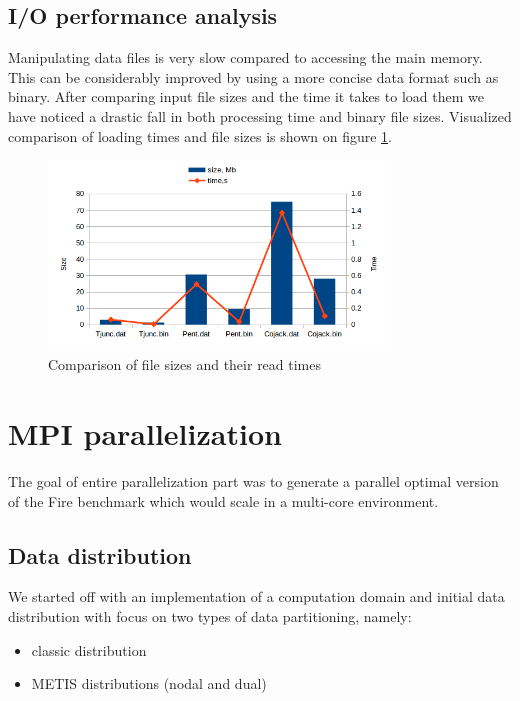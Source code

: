 \documentclass{article}
\begin{document}
\subsection{I/O performance analysis}
Manipulating data files is very slow compared to accessing the main memory. This can be considerably improved by using a more concise data format such as binary. After comparing input file sizes and the time it takes to load them we have noticed a drastic fall in both processing time and binary file sizes. Visualized comparison of loading times and file sizes is shown on figure \ref{fig:3}.

\begin{figure}[h!]
	\begin{center}
		\includegraphics[width=0.8\textwidth]{time-size}
		\caption{Comparison of file sizes and their read times}
		\label{fig:3}
	\end{center}
\end{figure}

\section{MPI parallelization}
The goal of entire parallelization part was to generate a parallel optimal version of the Fire benchmark which would scale in a multi-core environment.

\subsection{Data distribution}
We started off with an implementation of a computation domain and initial data distribution with focus on two types of data partitioning, namely:
\begin{itemize}
	\item classic distribution
	\item METIS distributions (nodal and dual)
\end{itemize}
\end{document}
